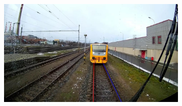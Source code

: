 \begin{figure}[H]
\begin{subfigure}{0.328\textwidth}
    \end{subfigure}
    \hfill
    \begin{subfigure}{0.328\textwidth}
        \includegraphics[width=\linewidth]{PICs/annotated_rs00244.jpg}
    \end{subfigure}

    \vspace{0.1cm} %


\end{figure}
